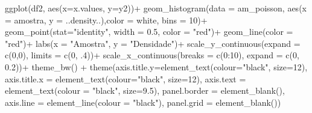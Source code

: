 \documentclass[
]{article}
\newenvironment{Shaded}{\begin{snugshade}}{\end{snugshade}}
\newcommand{\AttributeTok}[1]{\textcolor[rgb]{0.77,0.63,0.00}{#1}}
\newcommand{\DecValTok}[1]{\textcolor[rgb]{0.00,0.00,0.81}{#1}}
\newcommand{\FloatTok}[1]{\textcolor[rgb]{0.00,0.00,0.81}{#1}}
\newcommand{\FunctionTok}[1]{\textcolor[rgb]{0.00,0.00,0.00}{#1}}
\newcommand{\NormalTok}[1]{#1}
\newcommand{\SpecialCharTok}[1]{\textcolor[rgb]{0.00,0.00,0.00}{#1}}
\newcommand{\StringTok}[1]{\textcolor[rgb]{0.31,0.60,0.02}{#1}}
\begin{document}
\begin{Shaded}
\begin{Highlighting}[]
\FunctionTok{ggplot}\NormalTok{(df2, }\FunctionTok{aes}\NormalTok{(}\AttributeTok{x=}\NormalTok{x.values, }\AttributeTok{y=}\NormalTok{y2))}\SpecialCharTok{+}
  \FunctionTok{geom\_histogram}\NormalTok{(}\AttributeTok{data =}\NormalTok{ am\_poisson, }\FunctionTok{aes}\NormalTok{(}\AttributeTok{x =}\NormalTok{ amostra, }\AttributeTok{y =}\NormalTok{ ..density..),}\AttributeTok{color =} \StringTok{\textquotesingle{}white\textquotesingle{}}\NormalTok{, }\AttributeTok{bins =} \DecValTok{10}\NormalTok{)}\SpecialCharTok{+}
  \FunctionTok{geom\_point}\NormalTok{(}\AttributeTok{stat=}\StringTok{"identity"}\NormalTok{, }\AttributeTok{width =} \FloatTok{0.5}\NormalTok{, }\AttributeTok{color =} \StringTok{"red"}\NormalTok{)}\SpecialCharTok{+}
  \FunctionTok{geom\_line}\NormalTok{(}\AttributeTok{color =} \StringTok{"red"}\NormalTok{)}\SpecialCharTok{+}
  \FunctionTok{labs}\NormalTok{(}\AttributeTok{x =} \StringTok{"Amostra"}\NormalTok{, }\AttributeTok{y =} \StringTok{"Densidade"}\NormalTok{)}\SpecialCharTok{+}
  \FunctionTok{scale\_y\_continuous}\NormalTok{(}\AttributeTok{expand =} \FunctionTok{c}\NormalTok{(}\DecValTok{0}\NormalTok{,}\DecValTok{0}\NormalTok{), }\AttributeTok{limits =} \FunctionTok{c}\NormalTok{(}\DecValTok{0}\NormalTok{, .}\DecValTok{4}\NormalTok{))}\SpecialCharTok{+}
  \FunctionTok{scale\_x\_continuous}\NormalTok{(}\AttributeTok{breaks =} \FunctionTok{c}\NormalTok{(}\DecValTok{0}\SpecialCharTok{:}\DecValTok{10}\NormalTok{), }\AttributeTok{expand =} \FunctionTok{c}\NormalTok{(}\DecValTok{0}\NormalTok{, }\FloatTok{0.2}\NormalTok{))}\SpecialCharTok{+}
  \FunctionTok{theme\_bw}\NormalTok{() }\SpecialCharTok{+}
  \FunctionTok{theme}\NormalTok{(}\AttributeTok{axis.title.y=}\FunctionTok{element\_text}\NormalTok{(}\AttributeTok{colour=}\StringTok{"black"}\NormalTok{, }\AttributeTok{size=}\DecValTok{12}\NormalTok{),}
        \AttributeTok{axis.title.x =} \FunctionTok{element\_text}\NormalTok{(}\AttributeTok{colour=}\StringTok{"black"}\NormalTok{, }\AttributeTok{size=}\DecValTok{12}\NormalTok{),}
        \AttributeTok{axis.text =} \FunctionTok{element\_text}\NormalTok{(}\AttributeTok{colour =} \StringTok{"black"}\NormalTok{, }\AttributeTok{size=}\FloatTok{9.5}\NormalTok{),}
        \AttributeTok{panel.border =} \FunctionTok{element\_blank}\NormalTok{(),}
        \AttributeTok{axis.line =} \FunctionTok{element\_line}\NormalTok{(}\AttributeTok{colour =} \StringTok{"black"}\NormalTok{),}
        \AttributeTok{panel.grid =} \FunctionTok{element\_blank}\NormalTok{()) }


\end{Highlighting}
\end{Shaded}
\end{document}
